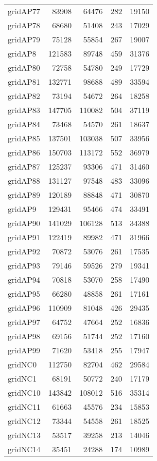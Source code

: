\begin{tabular}{lrrrr}
gridAP77 & 83908 & 64476 & 282 & 19150 \\
gridAP78 & 68680 & 51408 & 243 & 17029 \\
gridAP79 & 75128 & 55854 & 267 & 19007 \\
gridAP8 & 121583 & 89748 & 459 & 31376 \\
gridAP80 & 72758 & 54780 & 249 & 17729 \\
gridAP81 & 132771 & 98688 & 489 & 33594 \\
gridAP82 & 73194 & 54672 & 264 & 18258 \\
gridAP83 & 147705 & 110082 & 504 & 37119 \\
gridAP84 & 73468 & 54570 & 261 & 18637 \\
gridAP85 & 137501 & 103038 & 507 & 33956 \\
gridAP86 & 150703 & 113172 & 552 & 36979 \\
gridAP87 & 125237 & 93306 & 471 & 31460 \\
gridAP88 & 131127 & 97548 & 483 & 33096 \\
gridAP89 & 120189 & 88848 & 471 & 30870 \\
gridAP9 & 129431 & 95466 & 474 & 33491 \\
gridAP90 & 141029 & 106128 & 513 & 34388 \\
gridAP91 & 122419 & 89982 & 471 & 31966 \\
gridAP92 & 70872 & 53076 & 261 & 17535 \\
gridAP93 & 79146 & 59526 & 279 & 19341 \\
gridAP94 & 70818 & 53070 & 258 & 17490 \\
gridAP95 & 66280 & 48858 & 261 & 17161 \\
gridAP96 & 110909 & 81048 & 426 & 29435 \\
gridAP97 & 64752 & 47664 & 252 & 16836 \\
gridAP98 & 69156 & 51744 & 252 & 17160 \\
gridAP99 & 71620 & 53418 & 255 & 17947 \\
gridNC0 & 112750 & 82704 & 462 & 29584 \\
gridNC1 & 68191 & 50772 & 240 & 17179 \\
gridNC10 & 143842 & 108012 & 516 & 35314 \\
gridNC11 & 61663 & 45576 & 234 & 15853 \\
gridNC12 & 73344 & 54558 & 261 & 18525 \\
gridNC13 & 53517 & 39258 & 213 & 14046 \\
gridNC14 & 35451 & 24288 & 174 & 10989 \\

\end{tabular}

